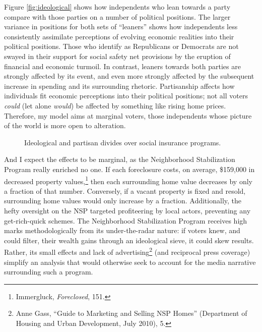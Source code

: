 \documentclass[12pt,oneside]{psthesis}
\begin{document}
Figure \ref{fig:ideological} shows how independents who lean towards a party compare with those parties on a number of political positions.
The larger variance in positions for both sets of ``leaners'' shows how independents less consistently assimilate perceptions of evolving economic realities into their political positions.
Those who identify as Republicans or Democrats are not swayed in their support for social safety net provisions by the eruption of financial and economic turmoil.
In contrast, leaners towards both parties are strongly affected by its event, and even more strongly affected by the subsequent increase in spending and its surrounding rhetoric.
Partisanship affects how individuals fit economic perceptions into their political positions; not all voters \emph{could} (let alone \emph{would}) be affected by something like rising home prices.
Therefore, my model aims at marginal voters, those independents whose picture of the world is more open to alteration.
\begin{figure}

{\centering {}

}

\caption{Ideological and partisan divides over social insurance programs.}\label{fig:ideological-social}
\end{figure}
And I expect the effects to be marginal, as the Neighborhood Stabilization Program really enriched no one.
If each foreclosure costs, on average, \$159,000 in decreased property values,\footnote{Immergluck, \emph{Foreclosed}, 151.} then each surrounding home value decreases by only a fraction of that number.
Conversely, if a vacant property is fixed and resold, surrounding home values would only increase by a fraction.
Additionally, the hefty oversight on the NSP targeted profiteering by local actors, preventing any get-rich-quick schemes.
The Neighborhood Stabilization Program receives high marks methodologically from its under-the-radar nature: if voters knew, and could filter, their wealth gains through an ideological sieve, it could skew results.
Rather, its small effects and lack of advertising\footnote{Anne Gass, ``Guide to Marketing and Selling NSP Homes'' (Department of Housing and Urban Development, July 2010), 5.} (and reciprocal press coverage) simplify an analysis that would otherwise seek to account for the media narrative surrounding such a program.
\end{document}
